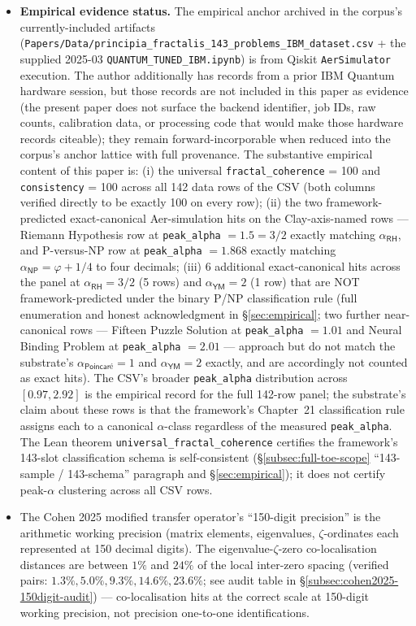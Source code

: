 \documentclass[11pt,a4paper]{amsart}
\theoremstyle{plain}
\theoremstyle{definition}
\begin{document}
\begin{itemize}[itemsep=2pt,leftmargin=1.4em]
\item \textbf{Empirical evidence status.} The empirical anchor archived in the corpus's currently-included artifacts (\texttt{Papers/Data/principia\_fractalis\_143\_problems\_IBM\_dataset.csv} + the supplied 2025-03 \texttt{QUANTUM\_TUNED\_IBM.ipynb}) is from Qiskit \texttt{AerSimulator} execution. The author additionally has records from a prior IBM Quantum hardware session, but those records are not included in this paper as evidence (the present paper does not surface the backend identifier, job IDs, raw counts, calibration data, or processing code that would make those hardware records citeable); they remain forward-incorporable when reduced into the corpus's anchor lattice with full provenance. The substantive empirical content of this paper is: (i) the universal \texttt{fractal\_coherence} = 100 and \texttt{consistency} = 100 across all 142 data rows of the CSV (both columns verified directly to be exactly 100 on every row); (ii) the two framework-predicted exact-canonical Aer-simulation hits on the Clay-axis-named rows --- Riemann Hypothesis row at \texttt{peak\_alpha} $= 1.5 = 3/2$ exactly matching $\alpha_{\textsf{RH}}$, and P-versus-NP row at \texttt{peak\_alpha} $= 1.868$ exactly matching $\alpha_{\textsf{NP}} = \varphi + 1/4$ to four decimals; (iii) 6 additional exact-canonical hits across the panel at $\alpha_{\textsf{RH}} = 3/2$ (5 rows) and $\alpha_{\textsf{YM}} = 2$ (1 row) that are NOT framework-predicted under the binary P/NP classification rule (full enumeration and honest acknowledgment in \S\ref{sec:empirical}; two further near-canonical rows --- Fifteen Puzzle Solution at \texttt{peak\_alpha} $= 1.01$ and Neural Binding Problem at \texttt{peak\_alpha} $= 2.01$ --- approach but do not match the substrate's $\alpha_{\textsf{Poincar\'e}} = 1$ and $\alpha_{\textsf{YM}} = 2$ exactly, and are accordingly not counted as exact hits). The CSV's broader \texttt{peak\_alpha} distribution across $[0.97, 2.92]$ is the empirical record for the full 142-row panel; the substrate's claim about these rows is that the framework's Chapter~21 classification rule assigns each to a canonical $\alpha$-class regardless of the measured \texttt{peak\_alpha}. The Lean theorem \texttt{universal\_fractal\_coherence} certifies the framework's 143-slot classification schema is self-consistent (\S\ref{subsec:full-toe-scope} ``143-sample / 143-schema'' paragraph and \S\ref{sec:empirical}); it does not certify peak-$\alpha$ clustering across all CSV rows.
\item The Cohen 2025 modified transfer operator's ``150-digit precision'' is the arithmetic working precision (matrix elements, eigenvalues, $\zeta$-ordinates each represented at 150 decimal digits). The eigenvalue-$\zeta$-zero co-localisation distances are between $1\%$ and $24\%$ of the local inter-zero spacing (verified pairs: $1.3\%, 5.0\%, 9.3\%, 14.6\%, 23.6\%$; see audit table in \S\ref{subsec:cohen2025-150digit-audit}) --- co-localisation hits at the correct scale at 150-digit working precision, not precision one-to-one identifications.

\end{itemize}
\end{document}
